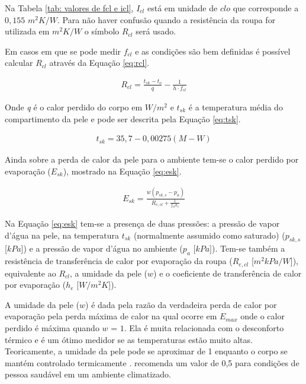 \documentclass[acronym,symbols,table]{fei}
\begin{document}
Na Tabela \ref{tab: valores de fcl e icl}, $I_{cl}$ está em unidade de $clo$ que corresponde a $0,155$ $m^2K/W$. Para não haver confusão quando a resistência da roupa for utilizada em $m^2K/W$ o símbolo $R_{cl}$ será usado.

Em casos em que se pode medir $f_{cl}$ e as condições são bem definidas é possível calcular $R_{cl}$ através da Equação \ref{eq:rcl}.

\begin{equation} \label{eq:rcl}
    \begin{aligned}
   R_{cl}= \frac{t_{sk}-t_{o}}{q}-\frac{1}{h\cdot f_{cl}}
    \end{aligned}
\end{equation}

Onde \textit{q} é o calor perdido do corpo em $W/m^2$ e $t_{sk}$ é a temperatura média do compartimento da pele e pode ser descrita pela Equação \ref{eq:tsk}.

\begin{equation} \label{eq:tsk}
    \begin{aligned}
   t_{sk}= 35,7 - 0,00275(M-W)
    \end{aligned}
\end{equation}

Ainda sobre a perda de calor da pele para o ambiente tem-se o calor perdido por evaporação ($E_{sk}$), mostrado na Equação \ref{eq:esk}.

\begin{equation} \label{eq:esk}
    \begin{aligned}
   E_{sk}= \frac{w(p_{sk,s}-p_{a})}{R_{e,cl}+\frac{1}{f_{cl}h_{e}}}
    \end{aligned}
\end{equation}

Na Equação \ref{eq:esk} tem-se a presença de duas pressões: a pressão de vapor d'água na pele, na temperatura $t_{sk}$ (normalmente assumido como saturado) ($p_{sk,s}$ [$kPa$]) e a pressão de vapor d'água no ambiente ($p_{a}$ [$kPa$]). Tem-se também a resistência de transferência de calor por evaporação da roupa ($R_{e,cl}$ [$m^2kPa/W$]), equivalente ao $R_{cl}$, a umidade da pele ($w$) e o coeficiente de transferência de calor por evaporação ($h_{e}$ [$W/m^2K$]).

A umidade da pele ($w$) é dada pela razão da verdadeira perda de calor por evaporação pela perda máxima de calor na qual ocorre em $E_{max}$ onde o calor perdido é máxima quando $w$ = $1$. Ela é muita relacionada com o desconforto térmico e é um ótimo medidor se as temperaturas estão muito altas. Teoricamente, a umidade da pele pode se aproximar de 1 enquanto o corpo se mantém controlado termicamente \cite{berglund1977evaporation}. \textcite{azer1982design} recomenda um valor de 0,5 para condições de pessoa saudável em um ambiente climatizado.
\end{document}
